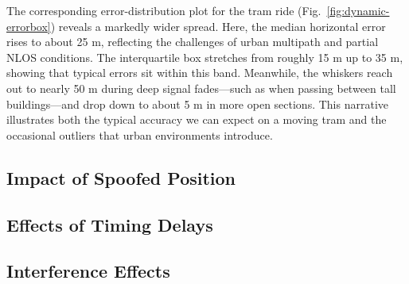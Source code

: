             The corresponding error-distribution plot for the tram ride (Fig.~\ref{fig:dynamic-errorbox}) reveals a markedly wider spread. Here, the median horizontal error rises to about 25 m, reflecting the challenges of urban multipath and partial NLOS conditions. The interquartile box stretches from roughly 15 m up to 35 m, showing that typical errors sit within this band. Meanwhile, the whiskers reach out to nearly 50 m during deep signal fades—such as when passing between tall buildings—and drop down to about 5 m in more open sections. This narrative illustrates both the typical accuracy we can expect on a moving tram and the occasional outliers that urban environments introduce.



    \subsection{Impact of Spoofed Position}
        


    \subsection{Effects of Timing Delays}
    


    \subsection{Interference Effects}
    

